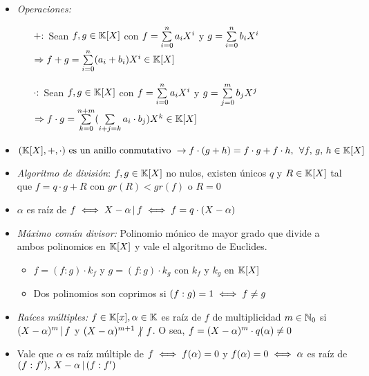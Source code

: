 \documentclass[12pt,a4paper, spanish]{article}
\begin{document}
\begin{itemize}
	\item \textit{Operaciones: }

	      \begin{itemize}
		      \item[$+:$] Sean $f,g \in \mathbb K[X]$ con $f = \sum\limits_{i=0}^{n} a_i X^i$ y $g = \sum\limits_{i=0}^{n} b_i X^i$\\
		            $\Rightarrow f + g = \sum\limits_{i=0}^{n} (a_i + b_i) X^i \in \mathbb K[X]$
		      \item[$\cdot:$] Sean $f,g \in \mathbb K[X]$ con $f = \sum\limits_{i=0}^{n} a_i X^i$ y $g = \sum\limits_{j=0}^{m} b_j X^j$\\
                $\Rightarrow f \cdot g = \sum\limits_{k=0}^{n+m} (\sum\limits_{i+j=k}^{} a_i \cdot b_j) X^k \in \mathbb K[X]$
	      \end{itemize}
        \item $(\mathbb K[X],+,\cdot) \text{ es un anillo conmutativo } \to f\cdot(g+h) = f\cdot g + f\cdot h,\, \;\forall f,\,g,\,h \in \mathbb K[X]$
	\item \textit{Algoritmo de división}: $f,g \in \mathbb K[X]$ no nulos, existen únicos $q$ y $R \in \mathbb K[X]$ tal que $f = q\cdot g + R$
	      con $gr(R) < gr(f)$ o $R = 0$

	\item $\alpha$ es raíz de $f \iff X - \alpha \, | \, f \iff f = q \cdot ( X - \alpha)$

	\item \textit{Máximo común divisor: } Polinomio mónico de mayor grado que divide a ambos polinomios en $\mathbb K[X]$
	      y vale el algoritmo de Euclides.
	      \begin{itemize}

		      \item $f = (f:g)\cdot k_f$ y $g = (f:g)\cdot k_g$ con $k_f$ y $k_g$ en $\mathbb K[X]$

		      \item Dos polinomios son coprimos si $(f:g) = 1 \iff f \neq g$
	      \end{itemize}

	\item \textit{Raíces múltiples: } $f \in \mathbb K[x], \alpha \in \mathbb K$ es raíz de $f$ de multiplicidad
	      $m \in \mathbb N_0$ si $(X - \alpha)^m \, | \, f$ y $(X - \alpha)^{m+1} \noDivide f$.
	      O sea, $f = (X - \alpha)^m \cdot q(\alpha) \neq 0$

	\item Vale que $\alpha$ es raíz múltiple de $f \iff f(\alpha) = 0$ y $f(\alpha) = 0 \iff \alpha$
      es raíz de $(f:f'),\, X - \alpha \, | \, (f:f')$

\end{itemize}
\end{document}
